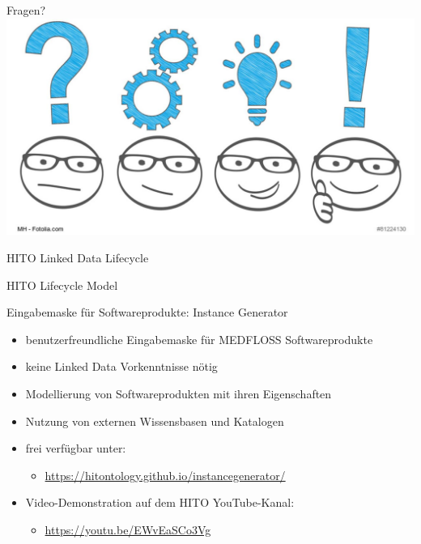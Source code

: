 \documentclass[aspectratio=1610,12pt]{beamer}
\begin{document}
\begin{frame}{Fragen?}
  \centering
  \vspace{-0.5cm}
  \includegraphics[width=\textwidth]{img/fragen.png}
\end{frame}

\begin{frame}{HITO Linked Data Lifecycle}
  \centering
  \vspace{-0.5cm}
\end{frame}

\begin{frame}{HITO Lifecycle Model}
 \centering
  \vspace{-0.5cm}
\end{frame}

\begin{frame}{Eingabemaske für Softwareprodukte: Instance Generator}
\begin{spacing}{1.5}
\begin{itemize}
\item benutzerfreundliche Eingabemaske für MEDFLOSS Softwareprodukte
\item keine Linked Data Vorkenntnisse nötig
\item Modellierung von Softwareprodukten mit ihren Eigenschaften
\item Nutzung von externen Wissensbasen und Katalogen
\item frei verfügbar unter:
\begin{itemize}
  \item \url{https://hitontology.github.io/instancegenerator/}
\end{itemize}
\pause
\item Video-Demonstration auf dem HITO YouTube-Kanal:
\begin{itemize}
\item \url{https://youtu.be/EWvEaSCo3Vg}
\end{itemize}
\end{itemize}
\end{spacing}
\end{frame}
\end{document}
